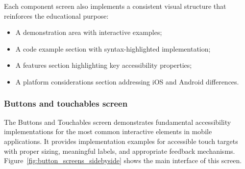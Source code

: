 Each component screen also implements a consistent visual structure that reinforces the educational purpose:

\begin{itemize}
    \item A demonstration area with interactive examples;
    \item A code example section with syntax-highlighted implementation;
    \item A features section highlighting key accessibility properties;
    \item A platform considerations section addressing iOS and Android differences.
\end{itemize}

\subsubsection{Buttons and touchables screen}
\label{subsubsec:buttons-touchables}

The Buttons and Touchables screen demonstrates fundamental accessibility implementations for the most common interactive elements in mobile applications. It provides implementation examples for accessible touch targets with proper sizing, meaningful labels, and appropriate feedback mechanisms. Figure~\ref{fig:button_screens_sidebyside} shows the main interface of this screen.

